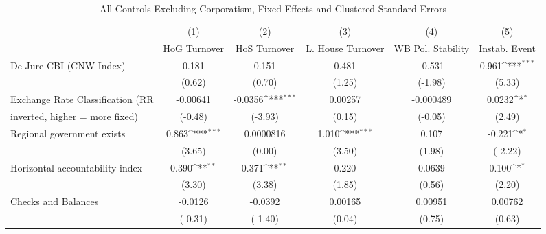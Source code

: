 \begin{table}[htbp]\centering
\def\sym#1{\ifmmode^{#1}\else\(^{#1}\)\fi}
\caption{All Controls Excluding Corporatism, Fixed Effects and Clustered Standard Errors \label{nccmultIndFEDJ}}
\begin{tabular}{l*{5}{c}}
\toprule
                                        &\multicolumn{1}{c}{(1)}&\multicolumn{1}{c}{(2)}&\multicolumn{1}{c}{(3)}&\multicolumn{1}{c}{(4)}&\multicolumn{1}{c}{(5)}\\
                                        &\multicolumn{1}{c}{HoG Turnover}&\multicolumn{1}{c}{HoS Turnover}&\multicolumn{1}{c}{L. House Turnover}&\multicolumn{1}{c}{WB Pol. Stability}&\multicolumn{1}{c}{Instab. Event}\\
\midrule
De Jure CBI (CNW Index)                 &    0.181         &    0.151         &    0.481         &   -0.531         &    0.961\sym{***}\\
                                        &   (0.62)         &   (0.70)         &   (1.25)         &  (-1.98)         &   (5.33)         \\
\addlinespace
Exchange Rate Classification (RR        & -0.00641         &  -0.0356\sym{***}&  0.00257         &-0.000489         &   0.0232\sym{*}  \\
inverted, higher = more fixed)          &  (-0.48)         &  (-3.93)         &   (0.15)         &  (-0.05)         &   (2.49)         \\
\addlinespace
Regional government exists              &    0.863\sym{***}&0.0000816         &    1.010\sym{***}&    0.107         &   -0.221\sym{*}  \\
                                        &   (3.65)         &   (0.00)         &   (3.50)         &   (1.98)         &  (-2.22)         \\
\addlinespace
Horizontal accountability index         &    0.390\sym{**} &    0.371\sym{**} &    0.220         &   0.0639         &    0.100\sym{*}  \\
                                        &   (3.30)         &   (3.38)         &   (1.85)         &   (0.56)         &   (2.20)         \\
\addlinespace
Checks and Balances                     &  -0.0126         &  -0.0392         &  0.00165         &  0.00951         &  0.00762         \\
                                        &  (-0.31)         &  (-1.40)         &   (0.04)         &   (0.75)         &   (0.63)         \\

\end{tabular}
\end{table}
